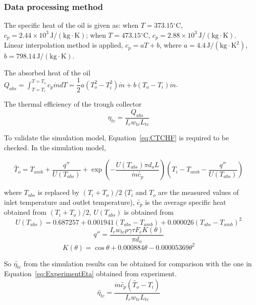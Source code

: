 \subsubsection{Data processing method}
The specific heat of the oil is given as: when $T = 373.15\mathrm{^\circ C}$, $c_p = 2.44\times10^3\,\mathrm{J/(kg\cdot K)}$; when $T = 473.15\mathrm{^\circ C}$, $c_p = 2.88\times10^3\,\mathrm{J/(kg\cdot K)}$. Linear interpolation method is applied, $c_p = aT + b$, where $a = 4.4\,\mathrm{J/(kg \cdot K^2)}$, $b = 798.14\,\mathrm{J/(kg\cdot K)}$.

The absorbed heat of the oil $Q_{abs} = \int_{T=T_i}^{T = T_o}c_p\dot{m}dT = \dfrac{1}{2}a(T_o^2 - T_i^2)\dot{m} + b (T_o - T_i)\dot{m}$.

The thermal efficiency of the trough collector 
\begin{equation}
	\eta_{tc} = \dfrac{Q_{abs}}{I_rw_{tc}L_{tc}}
	\label{eq:ExperimentEta}
\end{equation}

To validate the simulation model, Equation~\ref{eq:CTCHF} is required to be checked. In the simulation model,

\begin{equation}
	\widetilde{T_{o}}=T_{amb} + \dfrac{q''}{U(T_{abs})} + \exp(-\frac{U(T_{abs})\pi d_o L}{\dot{m}\widetilde{c_p}})(T_{i}-T_{amb}-\dfrac{q''}{U(T_{abs})})
	\label{eq:CheckT_o}
\end{equation}

where $T_{abs}$ is replaced by $(T_i + T_o)/2$ ($T_i$ and $T_o$ are the measured values of inlet temperature and outlet temperature), $\widetilde{c_p}$ is the average specific heat obtained from $(T_i + T_o)/2$,
$U(T_{abs})$ is obtained from~\cite{Romero2007}
\begin{equation}
	U(T_{abs}) = 0.687257 + 0.001941(T_{abs} - T_{amb}) + 0.000026(T_{abs} - T_{amb})^2
\end{equation}
\begin{equation}
	q'' = \frac{I_r w_{tc} \rho \gamma \tau F_e K(\theta)}{\pi d_o}
\end{equation}
\begin{equation}
	K(\theta) = \cos\theta+0.000884\theta-0.00005369\theta^2
\end{equation}

So $\widetilde{\eta_{tc}}$ from the simulation results can be obtained for comparison with the one in Equation~\ref{eq:ExperimentEta} obtained from experiment.
\begin{equation}
	\widetilde{\eta_{tc}} = \dfrac{\dot{m}\widetilde{c_p}(\widetilde{T_o}-T_i)}{I_rw_{tc}L_{tc}}
\end{equation}
	
